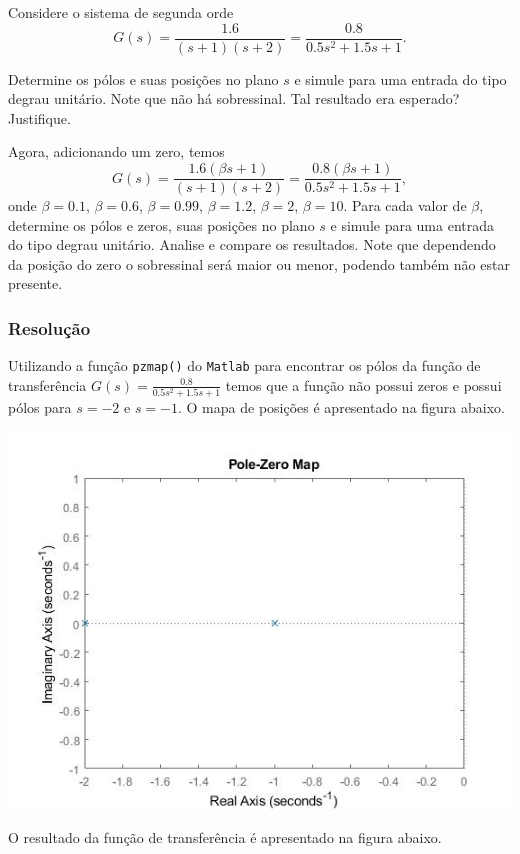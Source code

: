 \documentclass[
]{book}
\theoremstyle{definition}
\theoremstyle{definition}
\theoremstyle{definition}
\theoremstyle{remark}
\begin{document}
Considere o sistema de segunda orde
\[
G(s) = \frac {1.6}{(s+1)(s+2)} = \frac {0.8}{0.5s^2+1.5s+1}.
\]

Determine os pólos e suas posições no plano \(s\) e simule para uma entrada do tipo degrau unitário. Note que não há sobressinal. Tal resultado era esperado? Justifique.

Agora, adicionando um zero, temos
\[
G(s) = \frac {1.6(\beta s+1)}{(s+1)(s+2)} = \frac {0.8(\beta s+1)}{0.5s^2 +1.5s +1},
\]
onde \(\beta = 0.1\), \(\beta = 0.6\), \(\beta = 0.99\), \(\beta = 1.2\), \(\beta = 2\), \(\beta = 10\). Para cada valor de \(\beta\), determine os pólos e zeros, suas posições no plano \(s\) e simule para uma entrada do tipo degrau unitário. Analise e compare os resultados. Note que dependendo da posição do zero o sobressinal será maior ou menor, podendo também não estar presente.

\hypertarget{resoluuxe7uxe3o-3}{%
\subsubsection*{Resolução}\label{resoluuxe7uxe3o-3}}

Utilizando a função \texttt{pzmap()} do \texttt{Matlab} para encontrar os pólos da função de transferência \(G(s) = \frac {0.8}{0.5s^2+1.5s+1}\) temos que a função não possui zeros e possui pólos para \(s = -2\) e \(s = -1\). O mapa de posições é apresentado na figura abaixo.

\includegraphics{Imagens/Lab2/prob4.jpg}

O resultado da função de transferência é apresentado na figura abaixo.
\end{document}
